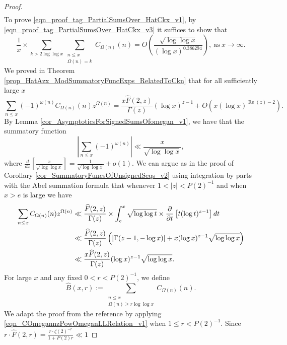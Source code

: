 \documentclass[11pt,reqno,a4letter]{article}
\numberwithin{figure}{section}
\numberwithin{table}{section}
\newcommand{\cf}{\textit{cf.\ }}
\theoremstyle{plain}
\numberwithin{theorem}{section}
\theoremstyle{definition}
\renewcommand{\Re}{\operatorname{Re}}
\begin{document}
\begin{proof}
\begin{align}
\end{align} 
To prove \eqref{eqn_proof_tag_PartialSumsOver_HatCkx_v1}, by 
\eqref{eqn_proof_tag_PartialSumsOver_HatCkx_v3} it suffices to show that 
\begin{equation} 
\label{eqn_proof_tag_PartialSumsOver_HatCkx_EquivCond_v2} 
\frac{1}{x} \times 
     \sum\limits_{k > 2\log\log x} \sum\limits_{\substack{n \leq x \\ \Omega(n) = k}} C_{\Omega(n)}(n)
     = O\left(\frac{\sqrt{\log\log x}}{(\log x)^{0.386294}}\right), 
     \mathrm{\ as\ } x \rightarrow \infty. 
\end{equation} 
We proved in Theorem \ref{prop_HatAzx_ModSummatoryFuncExps_RelatedToCkn} 
that for all sufficiently large $x$ 
\[
\sum_{n \leq x} (-1)^{\omega(n)} C_{\Omega(n)}(n) z^{\Omega(n)} = 
     \frac{x \widehat{F}(2, z)}{\Gamma(z)} (\log x)^{z-1} + O\left( 
     x (\log x)^{\Re(z)-2}\right). 
\]
By Lemma \ref{cor_AsymptoticsForSignedSumsOfomegan_v1}, 
we have that the summatory function 
\[
\left\lvert \sum_{n \leq x} (-1)^{\omega(n)} \right\rvert \ll 
     \frac{x}{\sqrt{\log\log x}}, 
\]
where $\frac{d}{dx}\left[\frac{x}{\sqrt{\log\log x}}\right] = \frac{1}{\sqrt{\log\log x}} + o(1)$. 
We can argue as in the proof of Corollary \ref{cor_SummatoryFuncsOfUnsignedSeqs_v2} 
using integration by parts with the Abel summation formula that whenever $1 < |z| < P(2)^{-1}$ 
and when $x > e$ is large we have 
\begin{align}
\notag
\sum_{n \leq x} C_{\Omega(n)}(n) z^{\Omega(n)} & \ll \frac{\widehat{F}(2, z)}{\Gamma(z)} \times 
     \int_e^{x} \sqrt{\log\log t} \times 
     \frac{\partial}{\partial t}\left[t (\log t)^{z-1}\right] dt \\ 
\notag 
     & \ll 
     \frac{\widehat{F}(2, z)}{\Gamma(z)} \left( 
     \left\lvert \Gamma(z-1, -\log x) \right\rvert + 
     x(\log x)^{z-1} \sqrt{\log\log x} 
     \right) \\ 
\label{eqn_COmegannzPowOmeganLLRelation_v1} 
     & \ll \frac{x \widehat{F}(2, z)}{\Gamma(z)} (\log x)^{z-1} \sqrt{\log\log x}. 
\end{align}
For large $x$ and any fixed $0 < r < P(2)^{-1}$, we define 
\[
\widehat{B}(x, r) := \sum_{\substack{n \leq x \\ \Omega(n) \geq r\log\log x}} 
     C_{\Omega(n)}(n). 
\]
We adapt the proof from the reference \cite[\cf Thm.\ 7.20; \S 7.4]{MV} by 
applying \eqref{eqn_COmegannzPowOmeganLLRelation_v1} when $1 \leq r < P(2)^{-1}$. 
Since $r \cdot \widehat{F}(2, r) = \frac{r \cdot \zeta(2)^{-r}}{1+P(2)r} \ll 1$ 

\end{proof}
\end{document}
